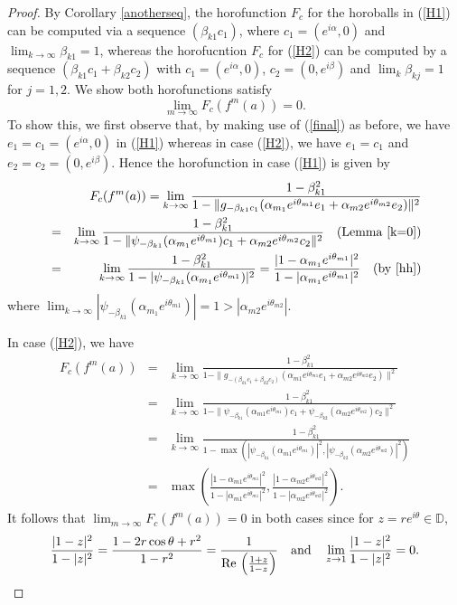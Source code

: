 \documentclass[12pt, twoside]{article}
\theoremstyle{definition}
\numberwithin{equation}{section}
\begin{document}
\begin{proof}
By Corollary \ref{anotherseq}, the horofunction $F_c$ for the horoballs in (\ref{H1}) can be computed
via a sequence $(\beta_{k1}c_1)$,
where $c_1 = (e^{i\alpha},0)$ and $\lim_{k\rightarrow\infty} \beta_{k1} =1$, whereas the horofucntion $F_c$
for (\ref{H2}) can be computed by a sequence $(\beta_{k1}c_1 + \beta_{k2}c_2)$ with
$c_1= (e^{i\alpha},0)$, $c_2=(0, e^{i\beta})$ and $\lim_k \beta_{kj}=1$ for $j=1,2$.
We show both horofunctions satisfy
\begin{equation}\label{zero}
\lim_{m\rightarrow \infty} F_c(f^m(a) ) =0.
\end{equation}
To show this, we first observe that, by
making use of (\ref{final}) as before, we have $e_1 =c_1= (e^{i\alpha},0)$ in (\ref{H1})
whereas in case (\ref{H2}), we have $e_1 = c_1$ and $e_2 =c_2= (0, e^{i\beta})$.
Hence the horofunction in  case (\ref{H1}) is given by
\begin{eqnarray*}
&&F_c(f^m(a)) = \lim_{k\rightarrow \infty}\frac{1-\beta_{k1}^2}{1-\|g_{-\beta_{k1}c_1}(\alpha_{m_1}e^{i\theta_{m1}}e_1
+\alpha_{m2}e^{i\theta_{m2}}e_2)\|^2}\\
&=&\lim_{k\rightarrow \infty}\frac{1-\beta_{k1}^2}{1-\|\psi_{-\beta_{k1}}(\alpha_{m_1}e^{i\theta_{m1}})c_1
+\alpha_{m2}e^{i\theta_{m2}}c_2\|^2} \quad ({\rm Lemma}~ \ref{k=0})\\
&=& \lim_{k\rightarrow \infty}\frac{1-\beta_{k1}^2}{1-|\psi_{-\beta_{k1}}(\alpha_{m_1}e^{i\theta_{m1}})|^2}
=  \frac{|1-\alpha_{m_1}e^{i\theta_{m1}}|^2}{1-|\alpha_{m_1}e^{i\theta_{m1}}|^2} \quad (\rm{by}~\ref{hh})
\end{eqnarray*}
where $\lim_{k\rightarrow \infty} |\psi_{-\beta_{k1}}(\alpha_{m_1}e^{i\theta_{m1}})| =1 > |\alpha_{m2}e^{i\theta_{m2}}|$.

In case  (\ref{H2}), we have
\begin{eqnarray*}
F_c(f^m(a))& =& \lim_{k\rightarrow \infty}\frac{1-\beta_{k1}^2}{1-\|g_{-(\beta_{k1}c_1+\beta_{k2}c_2)}(\alpha_{m1}e^{i\theta_{m1}}e_1
+\alpha_{m2}e^{i\theta_{m2}}e_2)\|^2}\\
 &=&\lim_{k\rightarrow \infty}\frac{1-\beta_{k1}^2}{1-\|\psi_{-\beta_{k1}}(\alpha_{m1}e^{i\theta_{m1}})c_1
+\psi_{-\beta_{k2}}(\alpha_{m2}e^{i\theta_{m2}})c_2\|^2}\\
 &=&\lim_{k\rightarrow \infty}\frac{1-\beta_{k1}^2}{1-\max(|\psi_{-\beta_{k1}}(\alpha_{m1}e^{i\theta_{m1}})|^2,
|\psi_{-\beta_{k2}}(\alpha_{m2}e^{i\theta_{m2}})|^2)}\\
&= &\max(\frac{|1-\alpha_{m1}e^{i\theta_{m1}}|^2}{1-|\alpha_{m1}e^{i\theta_{m1}}|^2}, \frac{|1-\alpha_{m2}e^{i\theta_{m2}}|^2}{1-|\alpha_{m2}e^{i\theta_{m2}}|^2}).
\end{eqnarray*}
It follows that $\lim_{m\rightarrow \infty} F_c(f^m(a) ) =0$ in both cases since for $z=re^{i\theta}\in \mathbb{D}$,
$$\frac{|1-z|^2}{1-|z|^2}
= \frac{1-2r\cos \theta +r^2}{1-r^2} = \frac{1}{{\rm Re}\,\left(\frac{1+z}{1-z}\right)} \quad {\rm and} \quad
\lim_{z\rightarrow 1}\frac{|1-z|^2}{1-|z|^2}=0.
$$


\end{proof}
\end{document}
